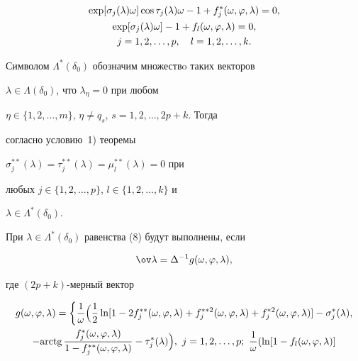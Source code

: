 \begin{pf}
\begin{gather}
\exp[\sigma_j(\lambda)\omega]\cos\tau_j(\lambda)\omega-1 


+f^*_j(\omega,\varphi,\lambda)=0,\\ 


\exp[\sigma_j(\lambda)\omega]-1+ 


f_l(\omega,\varphi,\lambda)=0,\notag\\ 


j=1,2,\dotsc,p,\quad l=1,2,\dotsc,k.\notag 


\end{gather} 


 


Символом $\Lambda^*(\delta_0)$ обозначим множествo таких векторов 


$\lambda\in\Lambda(\delta_0)$, что $\lambda_\eta=0$ при любом 


$\eta\in\{1,2,\dotsc,m\}$, $\eta\ne q_s$, $s=1,2,\dotsc,2p+k$. Тогда 


согласно условию~1) теоремы 


$\sigma^{**}_j(\lambda)=\tau^{**}_j(\lambda)=\mu^{**}_l(\lambda)=0$ при 


любых $j\in\{1,2,\dotsc,p\}$, $l\in\{1,2,\dotsc,k\}$ и 


$\lambda\in\Lambda^*(\delta_0)$. 


 


При $\lambda\in\Lambda^*(\delta_0)$ равенства (8) будут выполнены, если 


$$ 


\ov\lambda=\Delta^{-1}g(\omega,\varphi,\lambda), 


$$ 


где $(2p+k)$-мерный вектор 


\begin{multline*} 


g(\omega,\varphi,\lambda)=\bigg\{\frac{1}{\omega}\Big(\frac{1}{2} 


\ln[1-2f^{**}_j(\omega,\varphi,\lambda)+ 


f^{*{*}2}_j(\omega,\varphi,\lambda)+ 


f^{*2}_j(\omega,\varphi,\lambda)]-\sigma^*_j(\lambda),\\ 


-\text{arctg\,} 


\frac{f^*_j(\omega,\varphi,\lambda)} 


{1-f^{**}_j(\omega,\varphi,\lambda)}-\tau^*_j(\lambda)\Big), 


\ j=1,2,\dotsc,p;\ \frac{1}{\omega}(\ln[1-f_l(\omega,\varphi,\lambda)] 



\end{multline*}
\end{pf}
